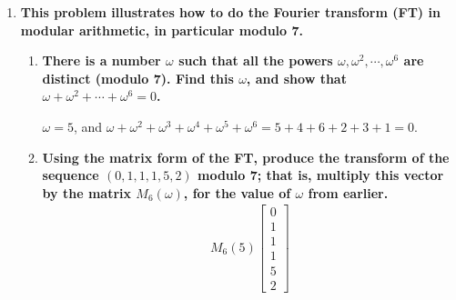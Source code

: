 \documentclass[a4paper,12pt]{article}
\begin{document}
\begin{enumerate}
    \item
        \boldmath\textbf{This problem illustrates how to do the Fourier transform (FT) in modular arithmetic, in particular modulo 7.
        }\unboldmath
            \begin{enumerate}
                \item
                    \boldmath\textbf{There is a number $\omega$ such that all the powers $\omega, \omega^2, \cdots, \omega^6$ are distinct (modulo 7). Find this $\omega$, and show that $\omega + \omega^2 + \cdots + \omega^6 = 0$.
                    }\unboldmath \par
                    \iffalse
                        $\omega = \sqrt[6]{1} = e^{i\pi/3} = \frac{1}{2} + \frac{\sqrt{3}}{2}i$. $\omega^6 = 1$, and hence
                        \begin{align*}
                            \omega + \omega^2 + \cdots + \omega^6 = 1 + \omega + \cdots + \omega^5 = \frac{1 - \omega^6}{1 - \omega} = 0.
                        \end{align*}
                    \fi
                    $\omega = 5$, and $\omega + \omega^2 + \omega^3 + \omega^4 + \omega^5 + \omega^6 = 5 + 4 + 6 + 2 + 3 + 1 = 0$.
                \item
                    \boldmath\textbf{Using the matrix form of the FT, produce the transform of the sequence $(0, 1, 1, 1, 5, 2)$ modulo 7; that is, multiply this vector by the matrix $M_6(\omega)$, for the value of $\omega$ from earlier.
                    }\unboldmath
                    \begin{align*}
                        \iffalse
                            &M_6 \left( \frac{1}{2} + \frac{\sqrt{3}}{2}i \right) (0, 1, 1, 1, 5, 2)^T \\
                            &= \left( 10, -\frac{5}{2} + \frac{5\sqrt{3}}{2}, -\frac{7}{2} - \frac{3\sqrt{3}}{2}, 2, -\frac{7}{2} + \frac{3\sqrt{3}}{2}, -\frac{5}{2} - \frac{5\sqrt{3}}{2} \right)
                        \fi
                        M_6(5) \left[ \begin{array}{c}
                                0 \\
                                1 \\
                                1 \\
                                1 \\
                                5 \\
                                2
                        \end{array} \right]

\end{align*}
\end{enumerate}
\end{enumerate}
\end{document}
